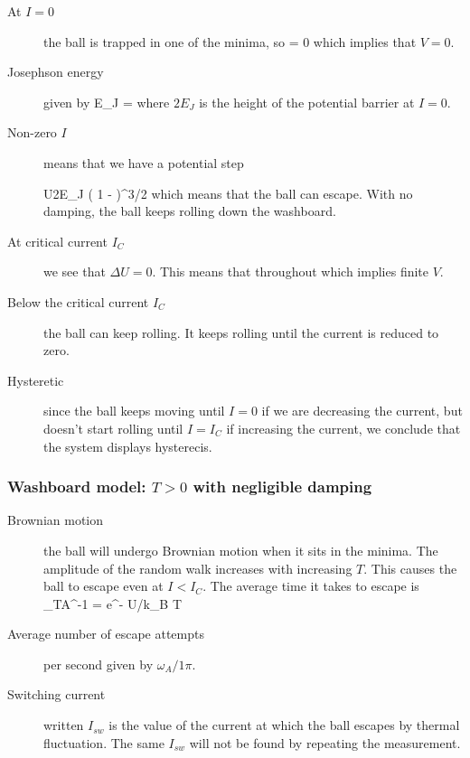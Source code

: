 \begin{description}
\item[At $I = 0$] the ball is trapped in one of the minima, so
\beq
{} = 0 
\eeq
which implies that $V = 0$. 

\item[Josephson energy] given by
\beq
E_J = 
\eeq
where $2 E_J$ is the height of the potential barrier at $I = 0$. 

\item[Non-zero $I$] means that we have a  potential step

\beq
\Delta U\simeq 2E_J \left( 1 -  \right)^{3/2}
\eeq
which means that the ball can escape. With no damping, the ball keeps rolling down the washboard. 

\item[At critical current $I_C$] we see that $\Delta U = 0$. This means that 
\beq
{} 
\eeq
 throughout which implies finite $V$. 
 
 \item[Below the critical current $I_C$] the ball can keep rolling. It keeps rolling until the current is reduced to zero. 
 
 \item[Hysteretic] since the ball keeps moving until $I = 0$ if we are decreasing the current, but doesn't start rolling until $I = I_C$ if increasing the current, we conclude that the system displays hysterecis. 
 
 \end{description}
 
\subsubsection{Washboard model: $T>0$ with negligible damping}
\begin{description}

\item[Brownian motion] the ball will undergo Brownian motion when it sits in the minima. The amplitude of the random walk increases with increasing $T$. This causes the ball to escape even at $I < I_C$.  The average time it takes to escape is
\beq
\tau_{TA}^{-1} =  e^{- \Delta U/k_B T}  
\eeq

\item[Average number of escape attempts] per second given by $\omega_A /1 \pi$. 

\item[Switching current] written $I_{sw}$ is the value of the current at which the ball escapes by thermal fluctuation. The same $I_{sw}$ will not be found by repeating the measurement. 

\end{description}
